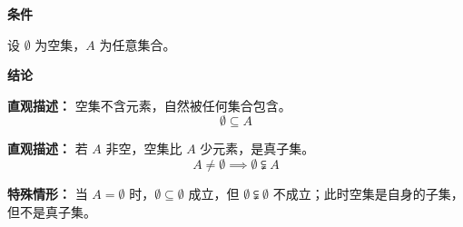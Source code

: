 \begin{statementbox}
	\textbf{\textcolor{CStatement}{条件}}
	\begin{description}[style=nextline, leftmargin=2.8em, labelsep=0.5em, itemsep=0.35em]
		\item[\textbf{\textcolor{CStatement}{条件 1（给定集合）：}}]
			设 $\emptyset$ 为空集，$A$ 为任意集合。
	\end{description}
	\textbf{\textcolor{CStatement}{结论}}
	\begin{description}[style=nextline, leftmargin=2.8em, labelsep=0.5em, itemsep=0.45em]
		\item[\textbf{\textcolor{CStatement}{结论一（空集是子集）：}}]
			\textbf{\textcolor{CStatement}{直观描述：}}
			空集不含元素，自然被任何集合包含。
			\[
				\emptyset \subseteq A
			\]
		\item[\textbf{\textcolor{CStatement}{推广结论（真子集情形）：}}]
			\textbf{\textcolor{CStatement}{直观描述：}}
			若 $A$ 非空，空集比 $A$ 少元素，是真子集。
			\[
				A \neq \emptyset \implies \emptyset \subsetneqq A
			\]
	\end{description}
	\textbf{\textcolor{CStatement}{特殊情形：}}
	当 $A = \emptyset$ 时，$\emptyset \subseteq \emptyset$ 成立，但 $\emptyset \subsetneqq \emptyset$ 不成立；此时空集是自身的子集，但不是真子集。
\end{statementbox}
